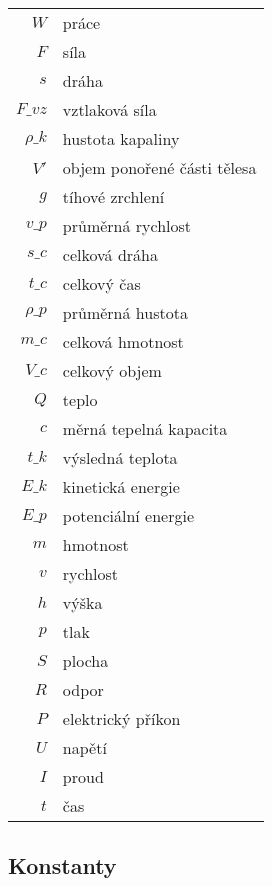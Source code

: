 \documentclass[vyfuk,\classoptions]{fksgeneric}
\begin{document}
\begin{framed}
\begin{multicols}{2}
\begin{center}
\begin{tabular}{ r l }
$W$ & práce \\
$F$ & síla\\
$s$ & dráha \\
$F\_{vz}$ & vztlaková síla\\
$\rho\_k$ & hustota kapaliny\\
$V'$ & objem ponořené části tělesa\\
$g$ & tíhové zrchlení\\
$v\_p$ & průměrná rychlost \\
$s\_c$ & celková dráha \\
$t\_c$ & celkový čas \\
$\rho\_p$ & průměrná hustota \\
$m\_c$ & celková hmotnost\\
$V\_c$ & celkový objem \\
$Q$ & teplo \\
$c$ & měrná tepelná kapacita \\
$t\_k$ & výsledná teplota \\
$E\_{k}$ & kinetická energie \\
$E\_{p}$ & potenciální energie \\
$m$ & hmotnost\\
$v$ & rychlost\\
$h$ & výška \\
$p$ & tlak \\
$S$ & plocha \\
$R$ & odpor \\
$P$ & elektrický příkon \\
$U$ & napětí \\
$I$ & proud \\
$t$ & čas\\
\end{tabular}
\end{center}

\end{multicols}
\end{framed}

\subsection{Konstanty}
\end{document}
